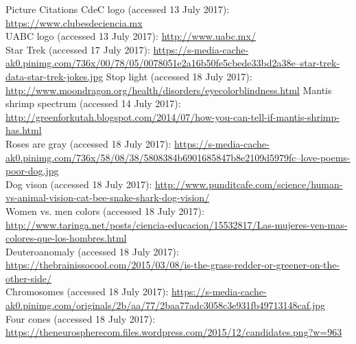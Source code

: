 \documentclass{beamer}
\begin{document}
\begin{frame}{Picture Citations} 
\fontsize{5}{4}\selectfont  
CdeC logo (accessed 13 July 2017): \href{https://www.clubesdeciencia.mx}{https://www.clubesdeciencia.mx}\\
UABC logo (accessed 13 July 2017): \href{http://www.uabc.mx/}{http://www.uabc.mx/}\\
Star Trek (accessed 17 July 2017): \href{https://s-media-cache-ak0.pinimg.com/736x/00/78/05/0078051e2a16b50fe5cbede33bd2a38e--star-trek-data-star-trek-jokes.jpg}{https://s-media-cache-ak0.pinimg.com/736x/00/78/05/0078051e2a16b50fe5cbede33bd2a38e--star-trek-data-star-trek-jokes.jpg}
Stop light (accessed 18 July 2017): \href{http://www.moondragon.org/health/disorders/eyecolorblindness.html}{http://www.moondragon.org/health/disorders/eyecolorblindness.html}
Mantis shrimp spectrum (accessed 14 July 2017): \href{http://greenforkutah.blogspot.com/2014/07/how-you-can-tell-if-mantis-shrimp-has.html}{http://greenforkutah.blogspot.com/2014/07/how-you-can-tell-if-mantis-shrimp-has.html}\\
Roses are gray (accessed 18 July 2017): \href{https://s-media-cache-ak0.pinimg.com/736x/58/08/38/5808384b6901685847b8e2109d5979fc--love-poems-poor-dog.jpg}{https://s-media-cache-ak0.pinimg.com/736x/58/08/38/5808384b6901685847b8e2109d5979fc--love-poems-poor-dog.jpg}\\
Dog vison (accessed 18 July 2017): \href{http://www.punditcafe.com/science/human-vs-animal-vision-cat-bee-snake-shark-dog-vision/}{http://www.punditcafe.com/science/human-vs-animal-vision-cat-bee-snake-shark-dog-vision/}\\
Women vs. men colors (accessed 18 July 2017): \href{http://www.taringa.net/posts/ciencia-educacion/15532817/Las-mujeres-ven-mas-colores-que-los-hombres.html}{http://www.taringa.net/posts/ciencia-educacion/15532817/Las-mujeres-ven-mas-colores-que-los-hombres.html}\\
Deuteroanomaly (accessed 18 July 2017): \href{https://thebrainissocool.com/2015/03/08/is-the-grass-redder-or-greener-on-the-other-side/}{https://thebrainissocool.com/2015/03/08/is-the-grass-redder-or-greener-on-the-other-side/}\\
Chromosomes (accessed 18 July 2017): \href{https://s-media-cache-ak0.pinimg.com/originals/2b/aa/77/2baa77adc3058c3e931fb49713148caf.jpg}{https://s-media-cache-ak0.pinimg.com/originals/2b/aa/77/2baa77adc3058c3e931fb49713148caf.jpg}\\
Four cones (accessed 18 July 2017): \href{https://theneurospherecom.files.wordpress.com/2015/12/candidates.png?w=963}{https://theneurospherecom.files.wordpress.com/2015/12/candidates.png?w=963}
\end{frame}
\end{document}
